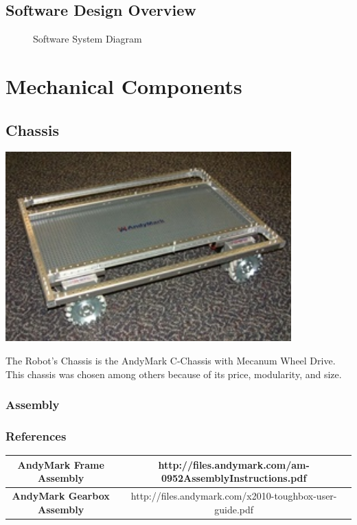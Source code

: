 \documentclass[letterpaper,12pt]{report}
\begin{document}
\section{Software Design Overview}
\begin{figure}[h!]
  \centering
  
  \caption{Software System Diagram}
  \label{fig:system_diagram}
\end{figure}

\chapter{Mechanical Components}
\section{Chassis}
\begin{center}
    \includegraphics[width=11cm]{pics/chassis/andymark_chassis.jpg}
\end{center}

The Robot's Chassis is the AndyMark C-Chassis with Mecanum Wheel Drive. This
chassis was chosen among others because of its price, modularity, and size.

\subsection{Assembly}
\subsection{References}

\begin{table}[h!]
  \begin{tabular}{| c | c |}
    \hline
    \textbf{AndyMark Frame Assembly} &  http://files.andymark.com/am-0952AssemblyInstructions.pdf\\
    \hline
    \textbf{AndyMark Gearbox Assembly} &  http://files.andymark.com/x2010-toughbox-user-guide.pdf\\
    \hline
  \end{tabular}
  \label{tab:fire_cmd_msg}
\end{table}
\end{document}

